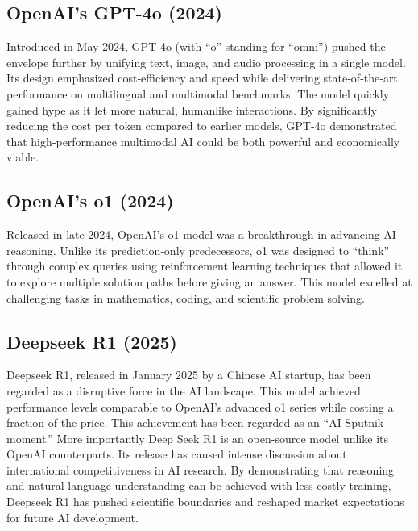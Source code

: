 \subsection{OpenAI's GPT-4o (2024)}
Introduced in May 2024, GPT‑4o (with “o” standing for “omni”) pushed the envelope further by unifying text, image, and audio processing in a single model. Its design emphasized cost‑efficiency and speed while delivering state‑of‑the‑art performance on multilingual and multimodal benchmarks. The model quickly gained hype as it let more natural, humanlike interactions. By significantly reducing the cost per token compared to earlier models, GPT‑4o demonstrated that high‑performance multimodal AI could be both powerful and economically viable.

\subsection{OpenAI's o1 (2024)}
Released in late 2024, OpenAI’s o1 model was a breakthrough in advancing AI reasoning. Unlike its prediction‑only predecessors, o1 was designed to “think” through complex queries using reinforcement learning techniques that allowed it to explore multiple solution paths before giving an answer. This model excelled at challenging tasks in mathematics, coding, and scientific problem solving.

\subsection{Deepseek R1 (2025)}
Deepseek R1, released in January 2025 by a Chinese AI startup, has been regarded as a disruptive force in the AI landscape. This model achieved performance levels comparable to OpenAI’s advanced o1 series while costing a fraction of the price. This achievement has been regarded as an “AI Sputnik moment.” More importantly Deep Seek R1 is an open-source model unlike its OpenAI counterparts. Its release has caused intense discussion about international competitiveness in AI research. By demonstrating that reasoning and natural language understanding can be achieved with less costly training, Deepseek R1 has pushed scientific boundaries and reshaped market expectations for future AI development.